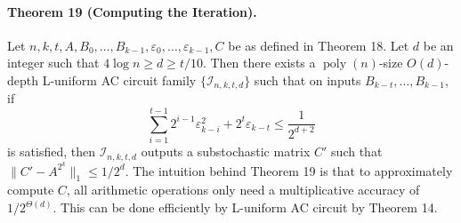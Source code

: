 \paragraph{Theorem 19 (Computing the Iteration).} Let $n,k,t,A,B_0,\ldots,B_{k-1},\varepsilon_0,\ldots,\varepsilon_{k-1},C$ be as defined in Theorem 18. Let $d$ be an integer such that $4\log n\ge d\ge t/10$. Then there exists a $\operatorname{poly}(n)$-size $O(d)$-depth L-uniform AC circuit family $\{\mathcal I_{n,k,t,d}\}$ such that on inputs $B_{k-t},\ldots,B_{k-1}$, if
\[\sum_{i=1}^{t-1}2^{i-1}\varepsilon_{k-i}^2+2^t\varepsilon_{k-t}\le\frac1{2^{d+2}}\]
is satisfied, then $\mathcal I_{n,k,t,d}$ outputs a substochastic matrix $C'$ such that $\|C'-A^{2^k}\|_1\le1/2^d$.
The intuition behind Theorem 19 is that to approximately compute $C$, all arithmetic operations only need a multiplicative accuracy of $1/2^{\Theta(d)}$. This can be done efficiently by L-uniform AC circuit by Theorem 14.

